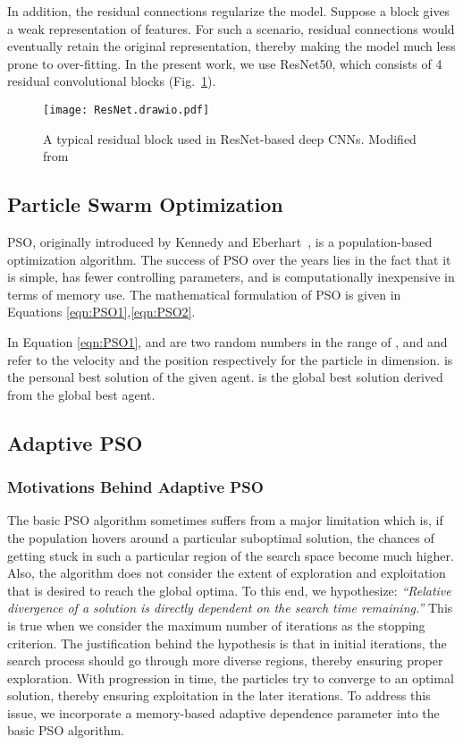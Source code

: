 \documentclass[final,3p,times]{elsarticle}
\begin{document}
In addition, the residual connections regularize the model. Suppose a block gives a weak representation of features. For such a scenario, residual connections would eventually retain the original representation, thereby making the model much {less} prone to over-fitting. In {the present} work, we use {ResNet50,} which consists of 4 {residual} convolutional blocks (Fig.~\ref{fig:resnet}).
\begin{figure}[ht!]
    \centering
    \texttt{[image: ResNet.drawio.pdf]}
    \caption{A typical residual block used in ResNet-based deep CNNs. Modified from \cite{he2016deep}}
    \label{fig:resnet}
\end{figure}
\subsection{Particle Swarm Optimization}
PSO, originally introduced by Kennedy and Eberhart~\cite{kennedy1995particle}, is a {population-based} optimization algorithm. The success of PSO over the years lies in the fact that it is simple, {has fewer} controlling {parameters,} and is computationally inexpensive in terms of memory use. The mathematical formulation of PSO is given in Equations \ref{eqn:PSO1},\ref{eqn:PSO2}.

In Equation \ref{eqn:PSO1},  and  are two random numbers in the range of , and  and  refer to the velocity and the position respectively for the  particle in  dimension.  is the personal best solution of the given agent.  is the global best solution derived from the global best agent.
\subsection{Adaptive PSO}
\subsubsection{Motivations Behind Adaptive PSO}
The basic PSO algorithm sometimes suffers from a major limitation which {is,} if the population hovers around a particular {suboptimal} solution, the chances of getting stuck in such a particular region of the search space become much higher. Also, the algorithm does not consider the extent of exploration and exploitation that is {desired} to reach the global optima. To this end, we hypothesize: \textit{“Relative divergence of a solution is directly dependent on the search time remaining.”} This is true when we consider the maximum number of iterations as the stopping criterion. {The justification behind the hypothesis is that in initial iterations, the search process should go through more diverse regions, thereby ensuring proper exploration. With progression in time, the particles try to converge to an optimal solution, thereby ensuring exploitation in the later iterations. To address this issue, we incorporate a memory-based adaptive dependence parameter into the basic PSO algorithm.}\\
\end{document}
